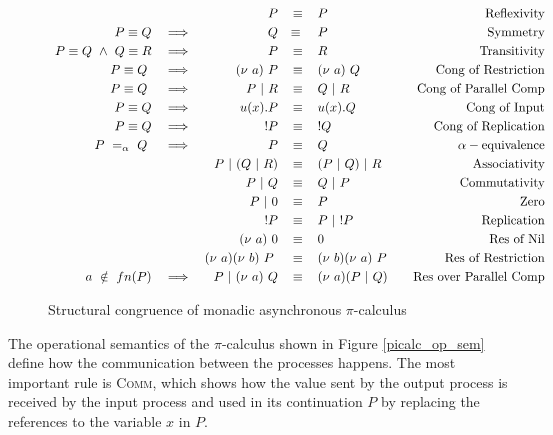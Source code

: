\documentclass[12pt,twoside]{report}
\begin{document}
\begin{figure}[h]
    \centering
    \begin{equation*}
    \centering
    \begin{array}{rcrclcr}
         & & P & \equiv & P & & \text{Reflexivity}\\[2.75pt]
         P \equiv Q & \implies & Q &\equiv\ & P & & \text{Symmetry}  \\[2.75pt]
         P \equiv Q\ \land\ Q \equiv R & \implies & P & \equiv & R & & \text{Transitivity} \\[2.75pt]
         P \equiv Q\ & \implies & (\nu\ a)\ P & \equiv & (\nu\ a)\ Q & & \text{Cong\ of\ Restriction} \\[2.75pt]
         P \equiv Q\ & \implies & P\ |\ R & \equiv & Q\ |\ R & & \text{Cong\ of\ Parallel\ Comp} \\[2.75pt]
         P \equiv Q & \implies & u(x).P & \equiv & u(x).Q & & \text{Cong\ of\ Input} \\[2.75pt]
         P \equiv Q & \implies & !P & \equiv & !Q & & \text{Cong\ of\ Replication} \\[2.75pt]
         P\ =_\alpha \ Q\ & \implies & P & \equiv & Q &  & \alpha-\text{equivalence} \\[2.75pt]
         & & P\ |\ (Q\ |\ R) & \equiv & (P\ |\ Q)\ |\ R & & \text{Associativity} \\[2.75pt]
         & & P\ |\ Q & \equiv & Q\ |\ P & & \text{Commutativity} \\[2.75pt]
         & & P\ |\ 0 & \equiv & P & & \text{Zero} \\[2.75pt]
         & & !P & \equiv & P\ |\ !P & & \text{Replication} \\[2.75pt]
         & & (\nu\ a)\ 0 & \equiv & 0 & & \text{Res\ of\ Nil} \\[2.75pt]
         & & (\nu\ a)(\nu\ b)\ P\ & \equiv & (\nu\ b)(\nu\ a)\ P & & \text{Res\ of\ Restriction} \\[2.75pt]
         a\ \notin\ fn(P) & \implies & \ P\ |\ (\nu\ a)\ Q & \equiv & (\nu\ a)(P\ |\ Q) & & \text{Res\ over\ Parallel\ Comp}
        \end{array}
    \end{equation*}
    \caption{Structural congruence of monadic asynchronous  $\pi$-calculus}
    \label{picalc_cong}
\end{figure}{}

The operational semantics of the $\pi$-calculus shown in Figure \ref{picalc_op_sem} define how the communication between the processes happens. The most important rule is \textsc{Comm}, which shows how the value sent by the output process is received by the input process and used in its continuation $P$ by replacing the references to the variable $x$ in $P$.
\end{document}
